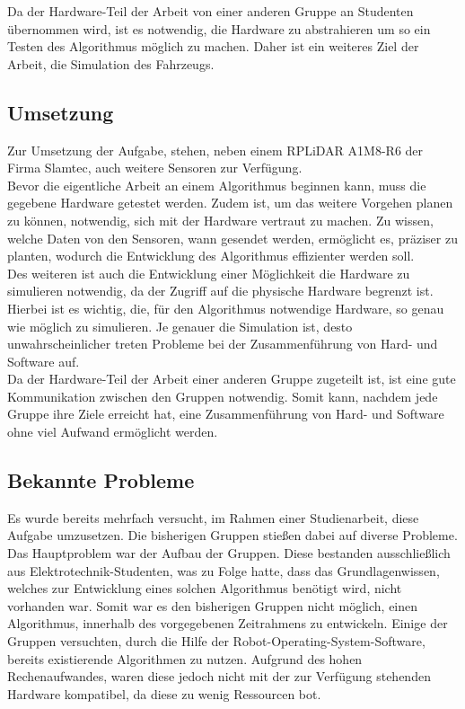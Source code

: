 Da der Hardware-Teil der Arbeit von einer anderen Gruppe an Studenten übernommen wird, ist es notwendig, die Hardware zu abstrahieren um so ein Testen des Algorithmus möglich zu machen. Daher ist ein weiteres Ziel der Arbeit, die Simulation des Fahrzeugs.

\subsection{Umsetzung}
Zur Umsetzung der Aufgabe, stehen, neben einem RPLiDAR A1M8-R6 der Firma Slamtec, auch weitere Sensoren zur Verfügung. \\

Bevor die eigentliche Arbeit an einem Algorithmus beginnen kann, muss die gegebene Hardware getestet werden.
Zudem ist, um das weitere Vorgehen planen zu können, notwendig, sich mit der Hardware vertraut zu machen.
Zu wissen, welche Daten von den Sensoren, wann gesendet werden, ermöglicht es, präziser zu planten, wodurch die Entwicklung des Algorithmus effizienter werden soll. \\

Des weiteren ist auch die Entwicklung einer Möglichkeit die Hardware zu simulieren notwendig, da der Zugriff auf die physische Hardware begrenzt ist.
Hierbei ist es wichtig, die, für den Algorithmus notwendige Hardware, so genau wie möglich zu simulieren.
Je genauer die Simulation ist, desto unwahrscheinlicher treten Probleme bei der Zusammenführung von Hard- und Software auf. \\

Da der Hardware-Teil der Arbeit einer anderen Gruppe zugeteilt ist, ist eine gute Kommunikation zwischen den Gruppen notwendig.
Somit kann, nachdem jede Gruppe ihre Ziele erreicht hat, eine Zusammenführung von Hard- und Software ohne viel Aufwand ermöglicht werden. \\

\subsection{Bekannte Probleme}
Es wurde bereits mehrfach versucht, im Rahmen einer Studienarbeit, diese Aufgabe umzusetzen.
Die bisherigen Gruppen stießen dabei auf diverse Probleme.
Das Hauptproblem war der Aufbau der Gruppen.
Diese bestanden ausschließlich aus Elektrotechnik-Studenten, was zu Folge hatte, dass das Grundlagenwissen, welches zur Entwicklung eines solchen Algorithmus benötigt wird, nicht vorhanden war.
Somit war es den bisherigen Gruppen nicht möglich, einen Algorithmus, innerhalb des vorgegebenen Zeitrahmens zu entwickeln.
Einige der Gruppen versuchten, durch die Hilfe der Robot-Operating-System-Software, bereits existierende Algorithmen zu nutzen.
Aufgrund des hohen Rechenaufwandes, waren diese jedoch nicht mit der zur Verfügung stehenden Hardware kompatibel, da diese zu wenig Ressourcen bot. \\


